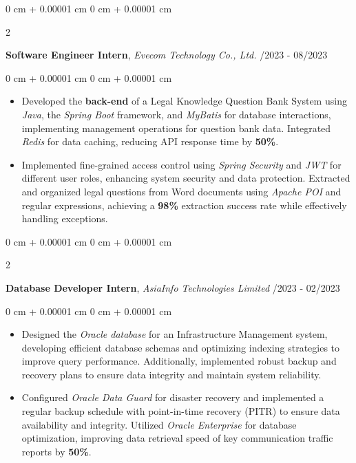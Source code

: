 \documentclass[10pt, letterpaper]{article}
\newenvironment{highlights}{
    \begin{itemize}[
        topsep=0.10 cm,
        parsep=0.10 cm,
        partopsep=0pt,
        itemsep=0pt,
        leftmargin=0 cm + 10pt
    ]
}{
    \end{itemize}
} %
\newenvironment{onecolentry}{
    \begin{adjustwidth}{
        0 cm + 0.00001 cm
    }{
        0 cm + 0.00001 cm
    }
}{
    \end{adjustwidth}
} %
\newenvironment{twocolentry}[2][]{
    \onecolentry
    \def\secondColumn{#2}
    \setcolumnwidth{\fill, 4.5 cm}
    \begin{paracol}{2}
}{
    \switchcolumn \raggedleft \secondColumn
    \end{paracol}
    \endonecolentry
} %
\begin{document}
        \vspace{0.2 cm}

        \begin{twocolentry}{
            07/2023 - 08/2023
            
        }
            \textbf{Software Engineer Intern}, \textit{Evecom Technology Co., Ltd.}\end{twocolentry}

        \begin{onecolentry}
            \begin{highlights}
                \item Developed the \textbf{back-end} of a Legal Knowledge Question Bank System using \textit{Java}, the \textit{Spring Boot} framework, and \textit{MyBatis} for database interactions, implementing management operations for question bank data. Integrated \textit{Redis} for data caching, reducing API response time by \textbf{50\%}.
                \item Implemented fine-grained access control using \textit{Spring Security} and \textit{JWT} for different user roles, enhancing system security and data protection. Extracted and organized legal questions from Word documents using \textit{Apache POI} and regular expressions, achieving a \textbf{98\%} extraction success rate while effectively handling exceptions.
                
            \end{highlights}
        \end{onecolentry}


        \vspace{0.2 cm}

        \begin{twocolentry}{
            01/2023 - 02/2023
        }
            \textbf{Database Developer Intern}, \textit{AsiaInfo Technologies Limited}\end{twocolentry}

        \begin{onecolentry}
            \begin{highlights}
                \item Designed the \textit{Oracle database} for an Infrastructure Management system, developing efficient database schemas and optimizing indexing strategies to improve query performance. Additionally, implemented robust backup and recovery plans to ensure data integrity and maintain system reliability.
                \item  Configured \textit{Oracle Data Guard} for disaster recovery and implemented a regular backup schedule with point-in-time recovery (PITR) to ensure data availability and integrity. Utilized \textit{Oracle Enterprise} for database optimization, improving data retrieval speed of key communication traffic reports by \textbf{50\%}.
            \end{highlights}
        \end{onecolentry}
\end{document}

